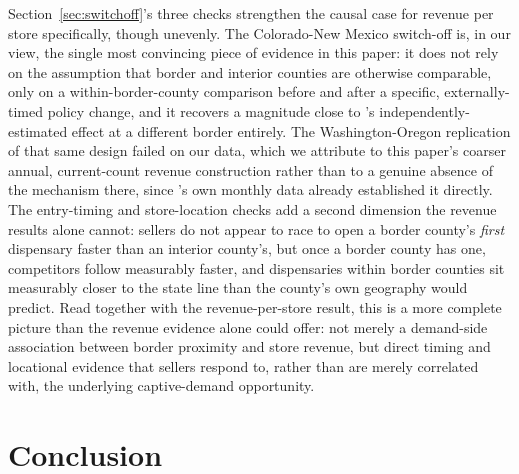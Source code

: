 ﻿\documentclass{article}
\begin{document}
Section~\ref{sec:switchoff}'s three checks strengthen the causal case for revenue per store specifically,
though unevenly. The Colorado-New Mexico switch-off is, in our view, the single most convincing piece of
evidence in this paper: it does not rely on the assumption that border and interior counties are otherwise
comparable, only on a within-border-county comparison before and after a specific, externally-timed policy
change, and it recovers a magnitude close to \citet{HansenMillerWeber2020}'s independently-estimated effect
at a different border entirely. The Washington-Oregon replication of that same design failed on our data,
which we attribute to this paper's coarser annual, current-count revenue construction rather than to a
genuine absence of the mechanism there, since \citeauthor{HansenMillerWeber2020}'s own monthly data already
established it directly. The entry-timing and store-location checks add a second dimension the revenue
results alone cannot: sellers do not appear to race to open a border county's \emph{first} dispensary
faster than an interior county's, but once a border county has one, competitors follow measurably faster,
and dispensaries within border counties sit measurably closer to the state line than the county's own
geography would predict. Read together with the revenue-per-store result, this is a more complete picture
than the revenue evidence alone could offer: not merely a demand-side association between border proximity
and store revenue, but direct timing and locational evidence that sellers respond to, rather than are
merely correlated with, the underlying captive-demand opportunity.

\section{Conclusion}
\end{document}
